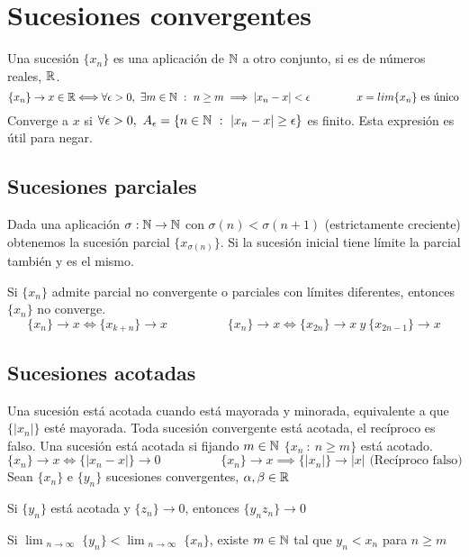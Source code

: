 \section{Sucesiones convergentes}
Una sucesión $\{ x_n \} $ es una aplicación de $\mathbb{N}$ a otro conjunto, si es de números reales, $\mathbb{R}$.
$$ \{x_n\}\rightarrow x\in\mathbb{R} \Longleftrightarrow
\forall\epsilon >0,\ \exists m\in\mathbb{N} \ : \ n\geq m 
\implies |x_n-x|<\epsilon 
\hspace{1.5cm}
x = lim\{x_n\} \text{ es único}
$$
Converge a $x$ si
$\forall\epsilon>0, \ A_{\epsilon} = \{ n\in\mathbb{N} \ : \ |x_n-x|\geq \epsilon \}$
es finito. 
Esta expresión es útil para negar.


\subsection{Sucesiones parciales}
Dada una aplicación $\sigma : \mathbb{N}\rightarrow\mathbb{N}$ con $\sigma (n) < \sigma (n+1)$ (estrictamente creciente) obtenemos la sucesión parcial $\{x_{\sigma (n)}\}$. Si la sucesión inicial tiene límite la parcial también y es el mismo.

Si $\{x_n\}$ admite parcial no convergente o parciales con límites diferentes, entonces $\{x_n\}$ no converge.
$$ \{x_n\} \rightarrow x \Longleftrightarrow \{x_{k+n}\} \rightarrow x 
\hspace{2cm}
\{x_n\} \rightarrow x \Longleftrightarrow 
\{x_{2n}\} \rightarrow x \ y \ 
\{x_{2n-1}\} \rightarrow x
$$

\subsection{Sucesiones acotadas}
Una sucesión está acotada cuando está mayorada y minorada, equivalente a que $\{|x_n|\}$ esté mayorada.
Toda sucesión convergente está acotada, el recíproco es falso.
Una sucesión está acotada si fijando $m\in\mathbb{N}$ $\{x_n \ : \ n\geq m\}$ está acotado.
$$ \{x_n\}\rightarrow x \Longleftrightarrow \{|x_n-x|\} \rightarrow 0 \hspace{2cm}
\{x_n\}\rightarrow x \implies \{|x_n|\}\rightarrow |x| 
\text{ (Recíproco falso)} $$
Sean $\{x_n\}$ e $\{y_n\}$ sucesiones convergentes, $\alpha,\beta\in\mathbb{R}$

Si $\{y_n\}$ está acotada y $\{z_n\}\rightarrow 0$, entonces $\{y_nz_n\}\rightarrow 0$

Si $\lim_{\substack{n\rightarrow\infty}} \{y_n\} < \lim_{\substack{n\rightarrow\infty}} \{x_n\}$, 
 existe $m\in\mathbb{N}$ tal que $y_n<x_n$ para $n\geq m$

